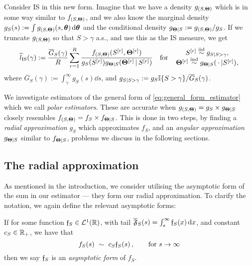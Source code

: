 Consider IS in this new form. Imagine that we have a density $g_{(S,\bm{\Theta})}$ which is in some way similar to $f_{(S,\bm{\Theta})}$, and we also know the marginal density $g_S(s) := \int g_{(S,\bm{\Theta})}(s,\bm{\theta}) \mathop{}\!\mathrm{d} \bm{\theta}$ and the conditional density $g_{\bm{\Theta} \mid S}:=g_{(S,\bm{\Theta})}/g_S$. If we truncate $g_{(S,\bm{\Theta})}$ so that $S>\gamma$ a.s., and use this as the IS measure, we get
\begin{equation} \label{eq:general_form_estimator}
\hat{l}_{\mathrm{IS}}(\gamma) := \frac{\overline{G}_S(\gamma)}{R} \sum_{r=1}^R \frac{ f_{(S,\bfTheta)}(S^{[r]}, \bfTheta^{[r]}) }{ g_S( S^{[r]} ) g_{\bfTheta \mid S}(\bfTheta^{[r]}\,|\, S^{[r]})}
\quad \text{for} \quad
\genfrac{}{}{0pt}{}{ S^{[r]} \iidDist g_{S \mid S>\gamma}, }{ \bfTheta^{[r]} \indDist g_{\bfTheta \mid S}( \,\cdot\, | S^{[r]}), }
\end{equation}
where $\overline{G}_S(\gamma) :=  \int_{\gamma}^\infty g_S(s) \dd s$, and $g_{S \mid S>\gamma}:=g_S \mathbb{I}\{  S>\gamma  \} / \overline{G}_S(\gamma)$.

We investigate estimators of the general form of \eqref{eq:general_form_estimator} which we call \emph{polar estimators}.
These are accurate when $g_{(S,\bm{\Theta})}= g_S \times g_{\bm{\Theta} \mid S}$ closely resembles $f_{(S,\bm{\Theta})}=f_S \times f_{\bm{\Theta} \mid S}$.
This is done in two steps, by finding a \emph{radial approximation} $g_S$ which approximates $f_S$, and an \emph{angular approximation} $g_{\bm{\Theta} \mid S}$ similar to $f_{\bm{\Theta} \mid S}$, problems we discuss in the following sections.


\subsection{The radial approximation}

As mentioned in the introduction, we consider utilising the asymptotic form of the sum in our estimator --- they form our radial approximation. To clarify the notation, we again define the relevant asymptotic forms:

\begin{definition}
If for some function $\mathfrak{f}_S \in \mathcal{L}^1(\mathbb{R})$, with tail $\overline{\mathfrak{F}}_S(s) = \int_s^\infty \mathfrak{f}_S(x) \mathop{}\!\mathrm{d} x$, and constant $c_S \in \mathbb{R}_+$, we have that
\begin{equation} \label{asymptotic_sum}
  f_S(s)\ \sim\ c_S \mathfrak{f}_S(s) \,,\qquad \text{for } s \to \infty
\end{equation}
then we say $\mathfrak{f}_S$ is an \emph{asymptotic form} of $f_S$. \remQED
\end{definition}

